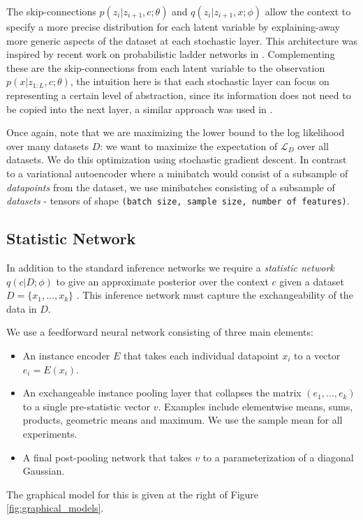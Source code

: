 \documentclass{article} %
\begin{document}
The skip-connections $p(z_i | z_{i+1}, c; \theta)$ and $q(z_i | z_{i+1},x ;\phi)$ allow the context to specify a more precise distribution  for each latent variable by explaining-away more generic aspects of the dataset at each stochastic layer. This architecture was inspired by recent work on probabilistic ladder networks in \citet{prob_ladder}. Complementing these are the skip-connections from each latent variable to the observation $p(x | z_{1:L},c ; \theta)$, the intuition here is that each stochastic layer can focus on representing a certain level of abstraction, since its information does not need to be copied into the next layer, a similar approach was used in \citet{auxiliary_ladder}.

Once again, note that we are maximizing the lower bound to the log likelihood over many datasets $D$: we want to maximize the expectation of $\mathcal{L}_D$ over all datasets. We do this optimization using stochastic gradient descent. In contrast to a variational autoencoder where a minibatch would consist of a subsample of \emph{datapoints} from the dataset, we use minibatches consisting of a subsample of \emph{datasets} - tensors of shape \texttt{(batch size, sample size, number of features)}.
\subsection{Statistic Network}
\label{statistic_network}
In addition to the standard inference networks we require a \emph{statistic network} $q(c | D ; \phi)$  to give an approximate posterior over the context $c$ given a dataset $D = \{x_1, \dots , x_k \}$ . This inference network must capture the exchangeability of the data in $D$.

We use a feedforward neural network consisting of three main elements:
\begin{itemize}
\item An instance encoder $E$ that takes each individual datapoint $x_i $ to a vector $e_i = E(x_i)$.
\item An exchangeable instance pooling layer that collapses the matrix $(e_1, \dots, e_k)$ to a single pre-statistic vector $v$. Examples include elementwise means, sums, products, geometric means and maximum. We use the sample mean for all experiments.
\item A final post-pooling network that takes $v$ to a parameterization of a diagonal Gaussian.
\end{itemize}
The graphical model for this is given at the right of Figure \ref{fig:graphical_models}.
\end{document}

